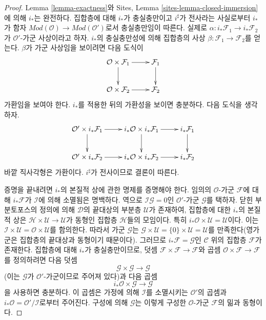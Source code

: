 \begin{proof}
Lemma \ref{lemma-exactness}와 Sites, Lemma
\ref{sites-lemma-closed-immersion}에 의해 $i_*$는 완전하다. 집합층에 대해
$i_*$가 충실충만이고 $i^\sharp$가 전사라는 사실로부터
$i_*$가 함자 $\textit{Mod}(\mathcal{O}) \to \textit{Mod}(\mathcal{O}')$로서
충실충만임이 따른다. 실제로
$\alpha : i_*\mathcal{F}_1 \to i_*\mathcal{F}_2$가
$\mathcal{O}'$-가군 사상이라고 하자. $i_*$의 충실충만성에 의해 집합층의
사상 $\beta : \mathcal{F}_1 \to \mathcal{F}_2$를 얻는다. $\beta$가 가군
사상임을 보이려면 다음 도식이
$$
\xymatrix{
\mathcal{O} \times \mathcal{F}_1 \ar[r] \ar[d] &
\mathcal{F}_1 \ar[d] \\
\mathcal{O} \times \mathcal{F}_2 \ar[r] &
\mathcal{F}_2
}
$$
가환임을 보여야 한다. $i_*$를 적용한 뒤의 가환성을 보이면 충분하다. 다음
도식을 생각하자.
$$
\xymatrix{
\mathcal{O}' \times i_*\mathcal{F}_1 \ar[r] \ar[d] &
i_*\mathcal{O} \times i_*\mathcal{F}_1 \ar[r] \ar[d] &
i_*\mathcal{F}_1 \ar[d] \\
\mathcal{O}' \times i_*\mathcal{F}_2 \ar[r] &
i_*\mathcal{O} \times i_*\mathcal{F}_2 \ar[r] &
i_*\mathcal{F}_2
}
$$
바깥 직사각형은 가환이다. $i^\sharp$가 전사이므로 결론이 따른다.

\medskip\noindent
증명을 끝내려면 $i_*$의 본질적 상에 관한 명제를 증명해야 한다. 임의의
$\mathcal{O}$-가군 $\mathcal{F}$에 대해 $i_*\mathcal{F}$가
$\mathcal{I}$에 의해 소멸됨은 명백하다. 역으로
$\mathcal{I}\mathcal{G} = 0$인 $\mathcal{O}'$-가군 $\mathcal{G}$를
택하자. 닫힌 부분토포스의 정의에 의해 $\mathcal{D}$의 끝대상의 부분층
$\mathcal{U}$가 존재하여, 집합층에 대한 $i_*$의 본질적 상은
$\mathcal{H} \times \mathcal{U} \to \mathcal{U}$가 동형인 집합층
$\mathcal{H}$들의 모임이다. 특히
$i_*\mathcal{O} \times \mathcal{U} = \mathcal{U}$이다. 이는
$\mathcal{I} \times \mathcal{U} = \mathcal{O} \times \mathcal{U}$를
함의한다. 따라서 가군 $\mathcal{G}$는
$\mathcal{G} \times \mathcal{U} = \{0\} \times \mathcal{U} = \mathcal{U}$를
만족한다(영가군은 집합층의 끝대상과 동형이기 때문이다). 그러므로
$i_*\mathcal{F} = \mathcal{G}$인 $\mathcal{C}$ 위의 집합층
$\mathcal{F}$가 존재한다. 집합층에 대해 $i_*$가 충실충만이므로, 덧셈
$\mathcal{F} \times \mathcal{F} \to \mathcal{F}$와 곱셈
$\mathcal{O} \times \mathcal{F} \to \mathcal{F}$를 정의하려면 다음 덧셈
$$
\mathcal{G} \times \mathcal{G} \longrightarrow \mathcal{G}
$$
(이는 $\mathcal{G}$가 $\mathcal{O}'$-가군이므로 주어져 있다)과 다음 곱셈
$$
i_*\mathcal{O} \times \mathcal{G} \to \mathcal{G}
$$
을 사용하면 충분하다. 이 곱셈은 가정에 의해 $\mathcal{I}$를 소멸시키는
$\mathcal{O}'$의 곱셈과 $i_*\mathcal{O} = \mathcal{O}'/\mathcal{I}$로부터
주어진다. 구성에 의해 $\mathcal{G}$는 이렇게 구성한 $\mathcal{O}$-가군
$\mathcal{F}$의 밂과 동형이다.
\end{proof}












